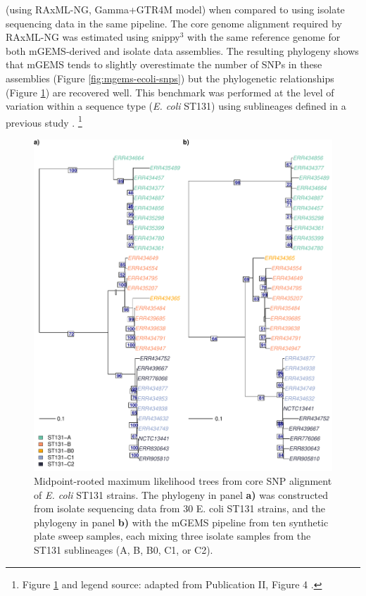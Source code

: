 \documentclass[officiallayout]{tktla}
\let\svthefootnote\thefootnote
\begin{document}
(using RAxML-NG, Gamma+GTR4M model) \citep{kozlov2019raxml} when
compared to using isolate sequencing data in the same pipeline. The
core genome alignment required by RAxML-NG was estimated using
snippy$^{3}$ with the same reference genome for both mGEMS-derived
and isolate data assemblies. The resulting phylogeny shows that mGEMS
tends to slightly overestimate the number of SNPs in these assemblies
(Figure \ref{fig:mgems-ecoli-snps}) but the phylogenetic relationships (Figure \ref{fig:mgems-ecoli-phylogeny}) are recovered well. This benchmark was
performed at the level of variation within a sequence type
(\textit{E. coli} ST131) using sublineages defined in a previous study
\citep{kallonen2017systematic}.
\noindent\let\thefootnote\relax\footnote{Figure \ref{fig:mgems-ecoli-phylogeny} and legend source: adapted from Publication II, Figure 4 \citep{maklin_bacterial_2021}.}
\addtocounter{footnote}{-1}\let\thefootnote\svthefootnote
\begin{figure}[!t]
    \centering
    \includegraphics[height=0.75\textheight,width=\textwidth,keepaspectratio]{img/reproduced/MGen2021_mGEMS_Figure_4.pdf}
    \caption{Midpoint-rooted maximum likelihood trees from core SNP
      alignment of \textit{E. coli} ST131 strains. The phylogeny in
      panel \textbf{a)} was constructed from isolate sequencing data
      from 30 E. coli ST131 strains, and the phylogeny in panel
      \textbf{b)} with the mGEMS pipeline from ten synthetic plate
      sweep samples, each mixing three isolate samples from the ST131
      sublineages (A, B, B0, C1, or C2).}
  \label{fig:mgems-ecoli-phylogeny}
\end{figure}
\end{document}
